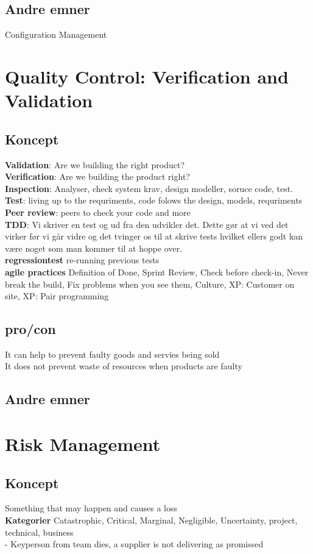 \documentclass[11pt,a4paper]{article}
\begin{document}
\subsection{Andre emner}
Configuration Management
\newpage
\section{Quality Control: Verification and Validation}
\subsection{Koncept}
\textbf{Validation}: Are we building the right product?\\
\textbf{Verification}: Are we building the product right?\\
\textbf{Inspection}: Analyser, check system krav, design modeller, soruce code, test.\\
\textbf{Test}: living up to the requriments, code folows the design, models, requriments\\
\textbf{Peer review}: peers to check your code and more\\
\textbf{TDD}: Vi skriver en test og ud fra den udvikler det. Dette gør at vi ved det virker før vi går vidre og det tvinger os til at skrive tests hvilket ellers godt kan være noget som man kommer til at hoppe over.\\
\textbf{regressiontest} re-running previous tests\\
\textbf{agile practices} Definition of Done, Sprint Review, Check before check-in, Never break the build, Fix problems when you see them, Culture, XP: Customer on site, XP: Pair programming
\subsection{pro/con}
It can help to prevent faulty goods and servies being sold\\
It does not prevent waste of resources when products are faulty
\subsection{Andre emner}
\newpage
\section{Risk Management}
\subsection{Koncept}
Something that may happen and causes a loss\\
\textbf{Kategorier} Catastrophic, Critical, Marginal, Negligible, Uncertainty, project, technical, business\\
- Keyperson from team dies, a supplier is not delivering as promissed
\end{document}
